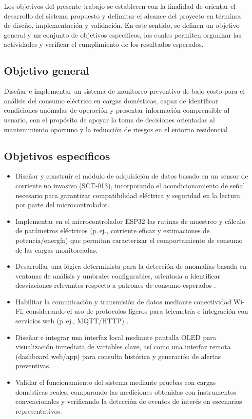 ﻿\documentclass[12pt,openright,oneside]{report}
\theoremstyle{mytheoremstyle}
\theoremstyle{mytheoremstyle}
\theoremstyle{myproblemstyle}
\begin{document}
Los objetivos del presente trabajo se establecen con la finalidad de orientar el desarrollo del sistema propuesto y delimitar el alcance del proyecto en términos de diseño, implementación y validación. En este sentido, se definen un objetivo general y un conjunto de objetivos específicos, los cuales permiten organizar las actividades y verificar el cumplimiento de los resultados esperados.

\subsection{Objetivo general}
\label{subsubsec:objetivo_general}

Diseñar e implementar un sistema de monitoreo preventivo de bajo costo para el análisis del consumo eléctrico en cargas domésticas, capaz de identificar condiciones anómalas de operación y presentar información comprensible al usuario, con el propósito de apoyar la toma de decisiones orientadas al mantenimiento oportuno y la reducción de riesgos en el entorno residencial \cite{nist-sp800-183}.

\subsection{Objetivos específicos}
\label{subsubsec:objetivos_especificos}

\begin{itemize}
    \item Diseñar y construir el módulo de adquisición de datos basado en un sensor de corriente no invasivo (SCT-013), incorporando el acondicionamiento de señal necesario para garantizar compatibilidad eléctrica y seguridad en la lectura por parte del microcontrolador.
    \item Implementar en el microcontrolador ESP32 las rutinas de muestreo y cálculo de parámetros eléctricos (p.\,ej., corriente eficaz y estimaciones de potencia/energía) que permitan caracterizar el comportamiento de consumo de las cargas monitoreadas.
    \item Desarrollar una lógica determinista para la detección de anomalías basada en ventanas de análisis y umbrales configurables, orientada a identificar desviaciones relevantes respecto a patrones de consumo esperados \cite{chandola2009anomaly}.
    \item Habilitar la comunicación y transmisión de datos mediante conectividad Wi-Fi, considerando el uso de protocolos ligeros para telemetría e integración con servicios web (p.\,ej., MQTT/HTTP) \cite{mqtt-oasis,fielding2000rest}.
    \item Diseñar e integrar una interfaz local mediante pantalla OLED para visualización inmediata de variables clave, así como una interfaz remota (dashboard web/app) para consulta histórica y generación de alertas preventivas.
    \item Validar el funcionamiento del sistema mediante pruebas con cargas domésticas reales, comparando las mediciones obtenidas con instrumentos convencionales y verificando la detección de eventos de interés en escenarios representativos.
\end{itemize}
\end{document}
